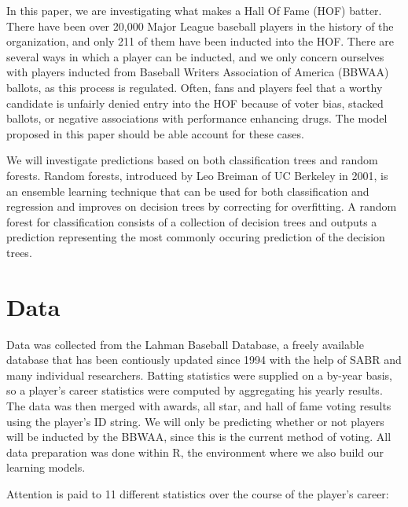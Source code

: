 \documentclass[preprint,12pt]{elsarticle}
\begin{document}
In this paper, we are investigating what makes a Hall Of Fame (HOF) batter. There have been over 20,000 Major League baseball players in the history of the organization, and only 211 of them have been inducted into the HOF. There are several ways in which a player can be inducted, and we only concern ourselves with players inducted from Baseball Writers Association of America (BBWAA) ballots, as this process is regulated. Often, fans and players feel that a worthy candidate is unfairly denied entry into the HOF because of voter bias, stacked ballots, or negative associations with performance enhancing drugs. The model proposed in this paper should be able account for these cases.

We will investigate predictions based on both classification trees and random forests. Random forests, introduced by Leo Breiman of UC Berkeley in 2001, is an ensemble learning technique that can be used for both classification and regression and improves on decision trees by correcting for overfitting. A random forest for classification consists of a collection of decision trees and outputs a prediction representing the most commonly occuring prediction of the decision trees.

\section{Data}
\label{data}
Data was collected from the Lahman Baseball Database, a freely available database that has been contiously updated since 1994 with the help of SABR and many individual researchers. Batting statistics were supplied on a by-year basis, so a player's career statistics were computed by aggregating his yearly results. The data was then merged with awards, all star, and hall of fame voting results using the player's ID string. We will only be predicting whether or not players will be inducted by the BBWAA, since this is the current method of voting. All data preparation was done within R, the environment where we also build our learning models. 

Attention is paid to 11 different statistics over the course of the player's career:
\end{document}
